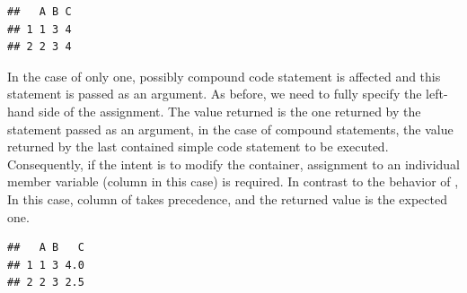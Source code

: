 \documentclass[krantz2]{krantz}\usepackage{knitr}
\begin{document}
\begin{explainbox}
\begin{knitrout}\footnotesize
{}\color{fgcolor}\begin{kframe}
\begin{alltt}
\hlopt{$} \hlkwb{<-} 
\end{alltt}


{\ttfamily\noindent\itshape\color{messagecolor}{\#\# The following object is masked \_by\_ .GlobalEnv:\\\#\# \\\#\#\ \ \ \  A}}\begin{alltt}
\hlopt{$} \hlkwb{<-}  \hlopt{+}  \hlopt{/} 
 \hlstd{)}
\end{alltt}
\begin{verbatim}
##   A B C
## 1 1 3 4
## 2 2 3 4
\end{verbatim}
\end{kframe}
\end{knitrout}

In the case of  only one, possibly compound code statement is affected and this statement is passed as an argument. As before, we need to fully specify the left-hand side of the assignment. The value returned is the one returned by the statement passed as an argument, in the case of compound statements, the value returned by the last contained simple code statement to be executed. Consequently, if the intent is to modify the container, assignment to an individual member variable (column in this case) is required. In contrast to the behavior of , In this case, column  of  takes precedence, and the returned value is the expected one.

\begin{knitrout}\footnotesize
{}\color{fgcolor}\begin{kframe}
\begin{alltt}
\hlopt{$} \hlkwb{<-} 
\hlopt{$} \hlkwb{<-}  \hlopt{+}  \hlopt{/} 
 \hlstd{)}
\end{alltt}
\begin{verbatim}
##   A B   C
## 1 1 3 4.0
## 2 2 3 2.5
\end{verbatim}
\end{kframe}
\end{knitrout}


\end{explainbox}
\end{document}
